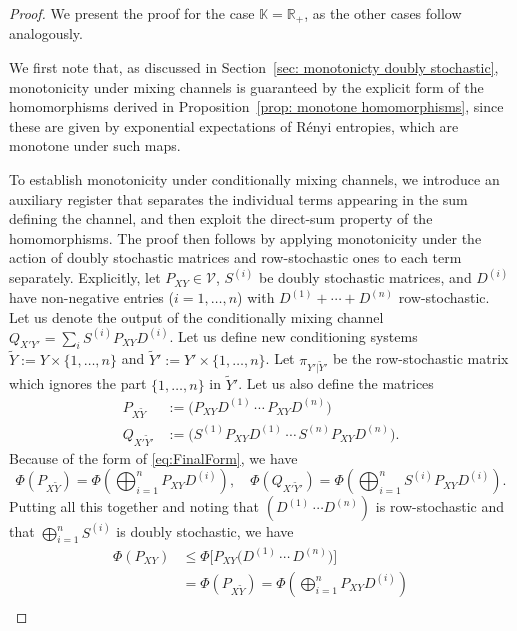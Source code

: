 \documentclass[aps,pra,11pt,onecolumn,nofootinbib,tightenlines]{revtex4-2}
\theoremstyle{definition}
\newcommand{\V}{\mathcal{V}}
\begin{document}
\begin{proof}
We present the proof for the case $\mathbb{K} = \mathbb{R}_+$, as the other cases follow analogously.

We first note that, as discussed in Section~\ref{sec: monotonicty doubly stochastic},
monotonicity under mixing channels is guaranteed by the explicit form of
the homomorphisms derived in Proposition~\ref{prop: monotone homomorphisms}, since
these are given by exponential expectations of R\'enyi entropies, which are
monotone under such maps.


To establish monotonicity under conditionally mixing channels, we introduce an auxiliary register that separates the individual terms appearing in the sum defining the channel, and then exploit the direct-sum property of the homomorphisms. The proof then follows by applying monotonicity under the action of doubly stochastic matrices and row-stochastic ones to each term separately.
Explicitly, let $P_{XY}\in\V$, $S^{(i)}$ be doubly stochastic matrices, and $D^{(i)}$ have non-negative entries ($i=1,\ldots,n$) with $D^{(1)}+\cdots+D^{(n)}$ row-stochastic. Let us denote the output of the conditionally mixing channel $Q_{X'Y'}=\sum_i S^{(i)}P_{XY}D^{(i)}$. Let us define new conditioning systems $\widetilde{Y}:=Y\times\{1,\ldots,n\}$ and $\widetilde{Y}':=Y'\times\{1,\ldots,n\}$. 
Let $\pi_{Y'|\widetilde{Y}'}$ be the row-stochastic matrix which ignores the part $\{1,\ldots,n\}$ in $\widetilde{Y}'$. Let us also define the matrices
\begin{align}
P_{X\widetilde{Y}}&:=\big(P_{XY}D^{(1)}\,\cdots\,P_{XY}D^{(n)}\big)\\
Q_{X'\widetilde{Y}'}&:=\big(S^{(1)}P_{XY}D^{(1)}\,\cdots\,S^{(n)}P_{XY}D^{(n)}\big).
\end{align}
Because of the form of \eqref{eq:FinalForm}, %
we have
\begin{equation}
\Phi(P_{X\widetilde{Y}})=\Phi\left(\bigoplus_{i=1}^n P_{XY}D^{(i)}\right),\quad\Phi(Q_{X'\widetilde{Y}'})=\Phi\left(\bigoplus_{i=1}^n S^{(i)}P_{XY}D^{(i)}\right).
\end{equation}
Putting all this together and noting that $(D^{(1)}\,\cdots D^{(n)})$ is row-stochastic and that $\bigoplus_{i=1}^n S^{(i)}$ is doubly stochastic, we have
\begin{align}
\Phi(P_{XY})&\leq\Phi\big[P_{XY}\big(D^{(1)}\,\cdots\,D^{(n)}\big)\big]\\
&=\Phi(P_{X\widetilde{Y}})=\Phi\left(\bigoplus_{i=1}^n P_{XY}D^{(i)}\right)\\

\end{align}
\end{proof}
\end{document}
